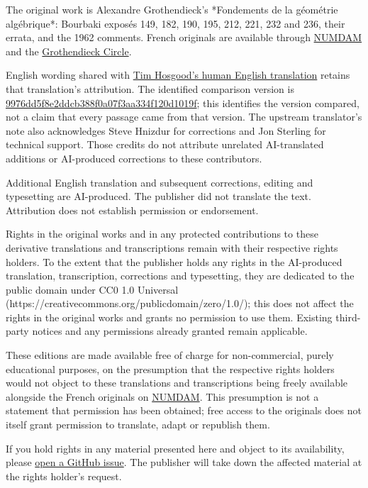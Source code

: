 \begingroup\small
The original work is Alexandre Grothendieck’s *Fondements de la géométrie algébrique*: Bourbaki exposés 149, 182, 190, 195, 212, 221, 232 and 236, their errata, and the 1962 comments. French originals are available through \href{https://www.numdam.org/}{NUMDAM} and the \href{https://webusers.imj-prg.fr/~leila.schneps/grothendieckcircle/FGA.pdf}{Grothendieck Circle}.

English wording shared with \href{https://github.com/thosgood/fga}{Tim Hosgood’s human English translation} retains that translation’s attribution. The identified comparison version is \href{https://github.com/thosgood/fga/tree/9976dd5f8e2ddcb388f0a07f3aa334f120d1019f}{9976dd5f8e2ddcb388f0a07f3aa334f120d1019f}; this identifies the version compared, not a claim that every passage came from that version. The upstream translator’s note also acknowledges Steve Hnizdur for corrections and Jon Sterling for technical support. Those credits do not attribute unrelated AI-translated additions or AI-produced corrections to these contributors.

Additional English translation and subsequent corrections, editing and typesetting are AI-produced. The publisher did not translate the text. Attribution does not establish permission or endorsement.

Rights in the original works and in any protected contributions to these derivative translations and transcriptions remain with their respective rights holders. To the extent that the publisher holds any rights in the AI-produced translation, transcription, corrections and typesetting, they are dedicated to the public domain under CC0 1.0 Universal (https://creativecommons.org/publicdomain/zero/1.0/); this does not affect the rights in the original works and grants no permission to use them. Existing third-party notices and any permissions already granted remain applicable.

These editions are made available free of charge for non-commercial, purely educational purposes, on the presumption that the respective rights holders would not object to these translations and transcriptions being freely available alongside the French originals on \href{https://www.numdam.org/journals/PMIHES/}{NUMDAM}. This presumption is not a statement that permission has been obtained; free access to the originals does not itself grant permission to translate, adapt or republish them.

If you hold rights in any material presented here and object to its availability, please \href{https://github.com/KokunoYumeto/fga-en/issues}{open a GitHub issue}. The publisher will take down the affected material at the rights holder's request.

\par\endgroup\clearpage

